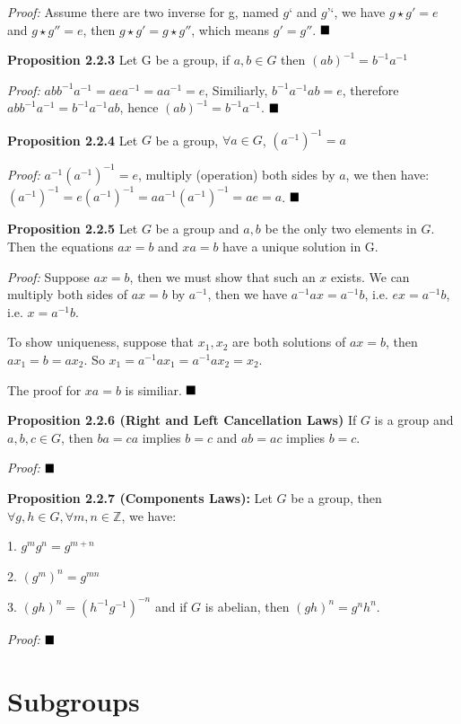 \documentclass[12pt,openany]{book}
\theoremstyle{definition}
\theoremstyle{definition}
\begin{document}
\textit{Proof:} Assume there are two inverse for g, named $g‘$ and $g’‘$, we have $g \star g' = e$ and $g \star g'' = e$, then $g \star g' = g \star g''$, which means $g' = g''$. $\hfill\blacksquare$

\noindent \textbf{Proposition 2.2.3} Let G be a group, if $a, b \in G$ then $(ab)^{-1} = b^{-1}a^{-1}$

\textit{Proof:} $abb^{-1}a^{-1} = aea^{-1} = aa^{-1} = e $, Similiarly, $b^{-1}a^{-1}ab = e$, therefore $abb^{-1}a^{-1} = b^{-1}a^{-1}ab $, hence $(ab)^{-1} = b^{-1}a^{-1}$. $\hfill\blacksquare$

\noindent \textbf{Proposition 2.2.4} Let $G$ be a group, $\forall a \in G$, $(a^{-1})^{-1}=a$

\textit{Proof:} $a^{-1}(a^{-1})^{-1} = e$, multiply (operation) both sides by $a$, we then have: $(a^{-1})^{-1} = e(a^{-1})^{-1} = aa^{-1}(a^{-1})^{-1} = ae = a $. $\hfill\blacksquare$

\noindent\textbf{Proposition 2.2.5} Let $G$ be a group and $a, b$ be the only two elements in $G$. Then the equations $ax=b$ and $xa=b$ have a unique solution in G.

\textit{Proof:} Suppose $ax=b$, then we must show that such an $x$ exists. We can multiply both sides of $ax=b$ by $a^{-1}$, then we have $a^{-1}ax = a^{-1}b$, i.e. $ex = a^{-1}b$, i.e. $x = a^{-1}b$.

To show uniqueness, suppose that $x_{1},x_{2}$ are both solutions of $ax=b$, then $ax_{1}=b=ax_{2}$. So $x_{1}=a^{-1}ax_{1} = a^{-1}ax_{2}=x_{2}$.

The proof for $xa=b$ is similiar. $\hfill\blacksquare$

\noindent\textbf{Proposition 2.2.6 (Right and Left Cancellation Laws)} If $G$ is a group and $a,b,c \in G$, then $ba=ca$ implies $b=c$ and $ab=ac$ implies $b=c$.

\textit{Proof:} $\hfill\blacksquare$

\noindent\textbf{Proposition 2.2.7 (Components Laws):} Let $G$ be a group, then $\forall g,h \in G, \forall m,n \in \mathbb{Z}$, we have:

1. $g^{m}g^{n}=g^{m+n}$

2. $(g^{m})^{n} = g^{mn}$

3. $ (gh)^{n} = (h^{-1}g^{-1})^{-n} $ and if $G$ is abelian, then $(gh)^{n} = g^nh^n$.

\textit{Proof:} $\hfill\blacksquare$

\noindent\textbf{}

\chapter{Subgroups}
\end{document}
